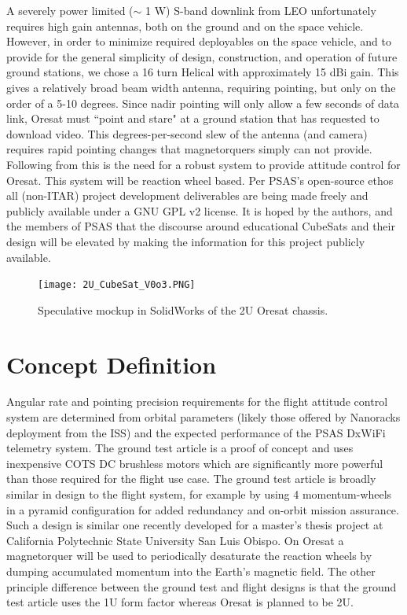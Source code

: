 \documentclass[]{aiaa-tc}%
\begin{document}
A severely power limited ($\sim$ 1 W) S-band downlink from LEO unfortunately requires high gain antennas, both on the ground and on the space vehicle. However, in order to minimize required deployables on the space vehicle, and to provide for the general simplicity of design, construction, and operation of future ground stations, we chose a 16 turn Helical with approximately 15 dBi gain. This gives a relatively broad beam width antenna, requiring pointing, but only on the order of a 5-10 degrees. Since nadir pointing will only allow a few seconds of data link, Oresat must ``point and stare" at a ground station that has requested to download video. This degrees-per-second slew of the antenna (and camera) requires rapid pointing changes that magnetorquers simply can not provide. Following from this is the need for a robust system to provide attitude control for Oresat. This system will be reaction wheel based. Per PSAS’s open-source ethos all (non-ITAR) project development deliverables are being made freely and publicly available under a GNU GPL v2 license\cite{Oresat:15bk}. It is hoped by the authors, and the members of PSAS that the discourse around educational CubeSats and their design will be elevated by making the information for this project publicly available.

\begin{figure}[h!]
  \centering
  \texttt{[image: 2U\_CubeSat\_V0o3.PNG]}
  \caption{Speculative mockup in SolidWorks of the 2U Oresat chassis.}
  \label{fig:oresat}
\end{figure}

\section{Concept Definition}
	Angular rate and pointing precision requirements for the flight attitude control system are determined from orbital parameters (likely those offered by Nanoracks deployment from the ISS) and the expected performance of the PSAS DxWiFi telemetry system. The ground test article is a proof of concept and uses inexpensive COTS DC brushless motors which are significantly more powerful than those required for the flight use case. The ground test article is broadly similar in design to the flight system, for example by using 4 momentum-wheels in a pyramid configuration for added redundancy and on-orbit mission assurance. Such a design is similar one recently developed for a master's thesis project at California Polytechnic State University San Luis Obispo\cite{Logan:08bk}. On Oresat a magnetorquer will be used to periodically desaturate the reaction wheels by dumping accumulated momentum into the Earth's magnetic field. The other principle difference between the ground test and flight designs is that the ground test article uses the 1U form factor whereas Oresat is planned to be 2U.
\end{document}
